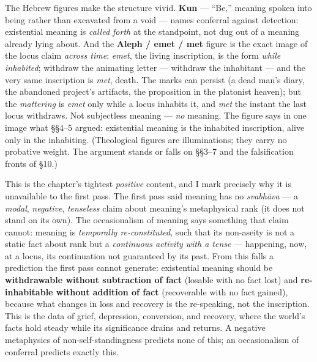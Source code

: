 \documentclass[11pt]{article}
\begin{document}
The Hebrew figures make the structure vivid. \textbf{Kun} — ``Be,'' meaning spoken into being rather than excavated from a void — names conferral against detection: existential meaning is \emph{called forth} at the standpoint, not dug out of a meaning already lying about. And the \textbf{Aleph /\allowbreak{} emet /\allowbreak{} met} figure is the exact image of the locus claim \emph{across time}: \emph{emet}, the living inscription, is the form \emph{while inhabited}; withdraw the animating letter — withdraw the inhabitant — and the very same inscription is \emph{met}, death. The marks can persist (a dead man's diary, the abandoned project's artifacts, the proposition in the platonist heaven); but the \emph{mattering} is \emph{emet} only while a locus inhabits it, and \emph{met} the instant the last locus withdraws. Not subjectless meaning — \emph{no} meaning. The figure says in one image what §§4–5 argued: existential meaning is the inhabited inscription, alive only in the inhabiting. (Theological figures are illuminations; they carry no probative weight. The argument stands or falls on §§3–7 and the falsification fronts of §10.)

This is the chapter's tightest \emph{positive} content, and I mark precisely why it is unavailable to the first pass. The first pass said meaning has no \emph{svabhāva} — a \emph{modal}, \emph{negative}, \emph{tenseless} claim about meaning's metaphysical rank (it does not stand on its own). The occasionalism of meaning says something that claim cannot: meaning is \emph{temporally re-constituted}, such that its non-aseity is not a static fact about rank but a \emph{continuous activity with a tense} — happening, now, at a locus, its continuation not guaranteed by its past. From this falls a prediction the first pass cannot generate: existential meaning should be \textbf{withdrawable without subtraction of fact} (losable with no fact lost) and \textbf{re-inhabitable without addition of fact} (recoverable with no fact gained), because what changes in loss and recovery is the re-speaking, not the inscription. This is the data of grief, depression, conversion, and recovery, where the world's facts hold steady while its significance drains and returns. A negative metaphysics of non-self-standingness predicts none of this; an occasionalism of conferral predicts exactly this.
\end{document}
